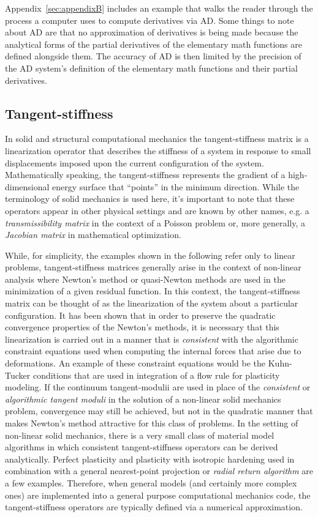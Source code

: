 \documentclass[preprint,12pt]{elsarticle}
\begin{document}
Appendix~\ref{sec:appendixB} includes an example that walks the reader through the process a computer uses to compute derivatives via AD.  Some things to note about AD are that no approximation of derivatives is being made because the analytical forms of the partial derivatives of the elementary math functions are defined alongside them. The accuracy of AD is then limited by the precision of the AD system's definition of the elementary math functions and their partial derivatives.
 
\subsection{Tangent-stiffness} 
\label{subsec:TS}

In solid and structural computational mechanics the tangent-stiffness matrix is a linearization operator that describes the stiffness of a system in response to small displacements imposed upon the current configuration of the system.  Mathematically speaking, the tangent-stiffness represents the gradient of a high-dimensional energy surface that ``points'' in the minimum direction. While the terminology of solid mechanics is used here, it's important to note that these operators appear in other physical settings and are known by other names, e.g. a \emph{transmissibility matrix} in the context of a Poisson problem or, more generally, a \emph{Jacobian matrix} in mathematical optimization.

While, for simplicity, the examples shown in the following refer only to linear problems, tangent-stiffness matrices generally arise in the context of non-linear analysis where Newton's method or quasi-Newton methods are used in the minimization of a given residual function.  In this context, the tangent-stiffness matrix can be thought of as the linearization of the system
about a particular configuration.  It has been shown \cite{hughes1978consistent,hughes1978unconditionally} that in order to preserve the quadratic convergence properties of the Newton's methods, it is necessary that this linearization is carried out in a manner that is \emph{consistent} with the algorithmic constraint equations used when computing the internal forces that arise due to deformations.  An example of these constraint equations would be the Kuhn-Tucker conditions \cite{simo1998} that are used in integration of a flow rule for plasticity modeling.  If the continuum tangent-modulii are used in place of the \emph{consistent} or \emph{algorithmic tangent moduli} in the solution of a non-linear solid mechanics problem, convergence may still be achieved, but not in the quadratic manner that makes Newton's method attractive for this class of problems.  In the setting of non-linear solid mechanics, there is a very small class of material model algorithms in which consistent tangent-stiffness operators can be derived analytically.  Perfect plasticity and plasticity with isotropic hardening used in combination with a general nearest-point projection or \emph{radial return algorithm} are a few examples.  Therefore, when general models (and certainly more complex ones) are implemented into a general purpose computational mechanics code, the tangent-stiffness operators are typically defined via a numerical approximation.  
\end{document}
